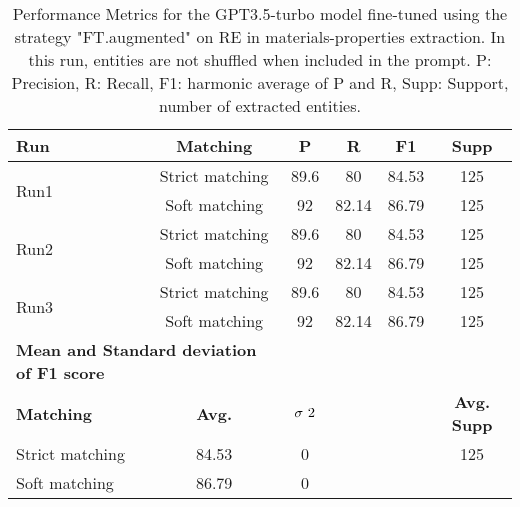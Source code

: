 \begin{table}[htbp]
    \small
    \centering
    \caption{Performance Metrics for the GPT3.5-turbo model fine-tuned using the strategy "FT.augmented" on RE in materials-properties extraction. In this run, entities are not shuffled when included in the prompt. P: Precision, R: Recall, F1: harmonic average of P and R, Supp: Support, number of extracted entities.}
    \begin{tabular}{lccccc}
        \toprule
        \textbf{Run} & \textbf{Matching} & \textbf{P} & \textbf{R} & \textbf{F1} & \textbf{Supp} \\
        \midrule
        \multirow{2}{*}{Run1}   & Strict matching   & 89.6 & 80 & 84.53 & 125 \\
                                & Soft matching     & 92 & 82.14 & 86.79 & 125 \\
        \midrule
        \multirow{2}{*}{Run2}   & Strict matching   & 89.6 & 80 & 84.53 & 125 \\
                                & Soft matching     & 92 & 82.14 & 86.79 & 125 \\
        \midrule
        \multirow{2}{*}{Run3}   & Strict matching   & 89.6 & 80 & 84.53 & 125 \\
                                & Soft matching     & 92 & 82.14 & 86.79 & 125 \\
        \midrule
        \multicolumn{2}{l}{\textbf{Mean and Standard deviation of F1 score}} & & & & \\
        \midrule
        \textbf{Matching} & \textbf{Avg.} & $\sigma\textsuperscript{2}$ & & & \textbf{Avg. Supp}\\
        Strict matching & 84.53 & 0 &  & &  125 \\
        Soft matching   & 86.79 & 0 & \\
        \bottomrule
    \end{tabular}
\end{table}



